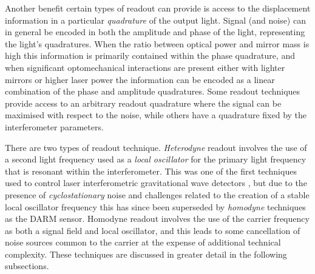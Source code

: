 Another benefit certain types of readout can provide is access to the displacement information in a particular \emph{quadrature} of the output light. Signal (and noise) can in general be encoded in both the amplitude and phase of the light, representing the light's quadratures. When the ratio between optical power and mirror mass is high this information is primarily contained within the phase quadrature, and when significant optomechanical interactions are present either with lighter mirrors or higher laser power the information can be encoded as a linear combination of the phase and amplitude quadratures. Some readout techniques provide access to an arbitrary readout quadrature where the signal can be maximised with respect to the noise, while others have a quadrature fixed by the interferometer parameters.

There are two types of readout technique. \emph{Heterodyne} readout involves the use of a second light frequency used as a \emph{local oscillator} for the primary light frequency that is resonant within the interferometer. This was one of the first techniques used to control laser interferometric gravitational wave detectors \cite{Willke2002}, but due to the presence of \emph{cyclostationary} noise \cite{Niebauer1991} and challenges related to the creation of a stable local oscillator frequency this has since been superseded by \emph{homodyne} techniques as the \gls{DARM} sensor. Homodyne readout involves the use of the carrier frequency as both a signal field and local oscillator, and this leads to some cancellation of noise sources common to the carrier at the expense of additional technical complexity. These techniques are discussed in greater detail in the following subsections.

